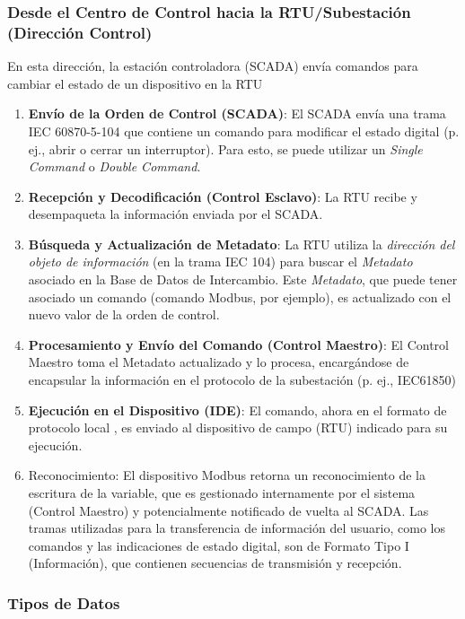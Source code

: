 \documentclass[a5paper]{book}%
\begin{document}
\subsubsection{Desde el Centro de Control hacia la RTU/Subestación (Dirección Control)}


En esta dirección, la estación controladora (SCADA) envía comandos para cambiar el estado de un dispositivo en la RTU

\begin{enumerate}
\item \textbf{Envío de la Orden de Control (SCADA)}: El SCADA envía una trama IEC 60870-5-104 que contiene un comando para modificar el estado digital (p. ej., abrir o cerrar un interruptor). Para esto, se puede utilizar un \textit{Single Command} o \textit{Double Command}.
  
\item \textbf{Recepción y Decodificación (Control Esclavo)}: La RTU recibe y desempaqueta la información enviada por el SCADA.
  
\item \textbf {Búsqueda y Actualización de Metadato}: La RTU utiliza la \textit{dirección del objeto de información} (en la trama IEC 104) para buscar el \textit{Metadato} asociado en la Base de Datos de Intercambio. Este \textit{Metadato}, que puede tener asociado un comando (comando Modbus, por ejemplo), es actualizado con el nuevo valor de la orden de control.
  
\item \textbf {Procesamiento y Envío del Comando (Control Maestro)}: El Control Maestro toma el Metadato actualizado y lo procesa, encargándose de encapsular la información en el protocolo de la subestación (p. ej., IEC61850)
\item \textbf{Ejecución en el Dispositivo (IDE)}: El comando, ahora en el formato de protocolo local , es enviado al dispositivo de campo (RTU) indicado para su ejecución.
\item Reconocimiento: El dispositivo Modbus retorna un reconocimiento de la escritura de la variable, que es gestionado internamente por el sistema (Control Maestro) y potencialmente notificado de vuelta al SCADA. Las tramas utilizadas para la transferencia de información del usuario, como los comandos y las indicaciones de estado digital, son de Formato Tipo I (Información), que contienen secuencias de transmisión y recepción.
\end{enumerate}


\subsubsection{Tipos de Datos}
\end{document}
